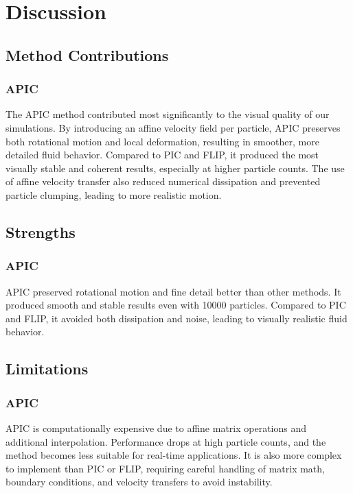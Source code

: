 \section{Discussion}
\subsection{Method Contributions}
\subsubsection{APIC}
The APIC method contributed most significantly to the visual quality of our simulations. By introducing an affine velocity field per particle, APIC preserves both rotational motion and local deformation, resulting in smoother, more detailed fluid behavior. Compared to PIC and FLIP, it produced the most visually stable and coherent results, especially at higher particle counts. The use of affine velocity transfer also reduced numerical dissipation and prevented particle clumping, leading to more realistic motion.

\subsection{Strengths}
\subsubsection{APIC}
APIC preserved rotational motion and fine detail better than other methods. It produced smooth and stable results even with 10000 particles. Compared to PIC and FLIP, it avoided both dissipation and noise, leading to visually realistic fluid behavior.

\subsection{Limitations}
\subsubsection{APIC}
APIC is computationally expensive due to affine matrix operations and additional interpolation. Performance drops at high particle counts, and the method becomes less suitable for real-time applications. It is also more complex to implement than PIC or FLIP, requiring careful handling of matrix math, boundary conditions, and velocity transfers to avoid instability.
